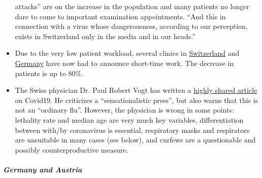 \begin{itemize}
  attacks'' are on the increase in the population and many patients no
  longer dare to come to important examination appointments. ``And this
  in connection with a virus whose dangerous­ness, according to our
  perception, exists in Switzerland only in the media and in our
  heads.''
\item
  Due to the very low patient workload, several clinics in
  \href{https://www.20min.ch/schweiz/news/story/Spitaeler-28949526}{Switzerland}
  and
  \href{https://www.spiegel.de/wirtschaft/unternehmen/trotz-corona-pandemie-warum-kliniken-jetzt-kurzarbeit-anmelden-a-3dc61bc9-fb12-4298-8022-bb4c2be39d7d}{Germany}
  have now had to announce short-time work. The decrease in patients is
  up to 80\%.
\item
  The Swiss physician Dr. Paul Robert Vogt has written a
  \href{https://www.mittellaendische.ch/2020/04/07/covid-19-eine-zwischenbilanz-oder-eine-analyse-der-moral-der-medizinischen-fakten-sowie-der-aktuellen-und-zuk\%C3\%BCnftigen-politischen-entscheidungen/}{highly
  shared article} on Covid19. He criticizes a ``sensationalistic
  press'', but also warns that this is not an ``ordinary flu''. However,
  the physician is wrong in some points: lethality rate and median age
  are very much key variables, differentiation between with/by
  coronavirus is essential, respiratory masks and respirators are
  unsuitable in many cases (see below), and curfews are a questionable
  and possibly counterproductive measure.
\end{itemize}

\hypertarget{germany-and-austria-1}{%
\subparagraph{\texorpdfstring{\textbf{Germany and
Austria}}{Germany and Austria}}\label{germany-and-austria-1}}

